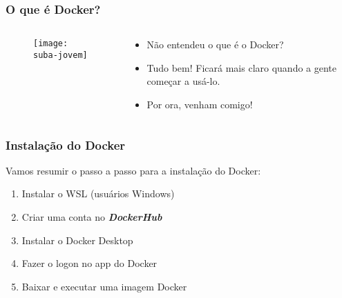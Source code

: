 \documentclass[t, 10pt, aspectratio=169, table, x11names]{beamer}
\begin{document}
	\begin{frame}
		\frametitle{O que é Docker?}
		\begin{columns}[t]
			\begin{column}{0.50\textwidth}
				\vspace{3mm}
				\begin{figure}[h]
					\texttt{[image: suba-jovem]}
				\end{figure}
			\end{column}
			\begin{column}{0.55\textwidth}
				\vspace{7mm}
				\begin{itemize}
					\large
					\item[] Não entendeu o que é o Docker?
					\vspace{3mm}
					\item[] Tudo bem! Ficará mais claro quando a gente começar a usá-lo.
					\vspace{3mm}
					\item[] Por ora, venham comigo!
				\end{itemize}
			\end{column}
			\begin{column}{0.05\textwidth}
			\end{column}
		\end{columns}
	\end{frame}

	\begin{frame}
		\frametitle{Instalação do Docker}
		Vamos resumir o passo a passo para a instalação do Docker:
		\begin{enumerate}
			\item Instalar o WSL (usuários Windows)
			\item Criar uma conta no \textit\textbf{DockerHub}
			\item Instalar o Docker Desktop
			\item Fazer o logon no app do Docker
			\item Baixar e executar uma imagem Docker 
		\end{enumerate}
	\end{frame}
\end{document}
